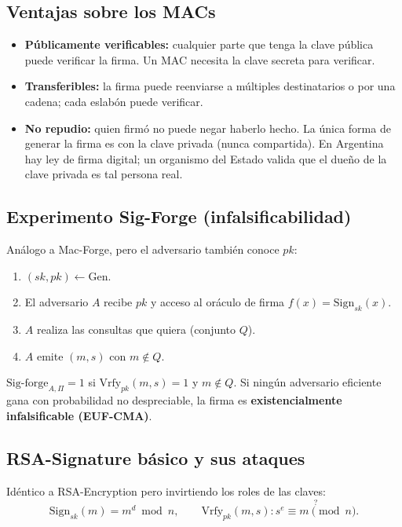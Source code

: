 \documentclass[11pt,a4paper]{article}
\begin{document}
\subsection{Ventajas sobre los MACs}

\begin{itemize}[leftmargin=1.4em,nosep]
  \item \textbf{Públicamente verificables:} cualquier parte que tenga la clave pública
  puede verificar la firma. Un MAC necesita la clave secreta para verificar.
  \item \textbf{Transferibles:} la firma puede reenviarse a múltiples destinatarios o
  por una cadena; cada eslabón puede verificar.
  \item \textbf{No repudio:} quien firmó no puede negar haberlo hecho. La única forma
  de generar la firma es con la clave privada (nunca compartida). En Argentina hay ley
  de firma digital; un organismo del Estado valida que el dueño de la clave privada es
  tal persona real.
\end{itemize}

\subsection{Experimento Sig-Forge (infalsificabilidad)}

Análogo a Mac-Forge, pero el adversario también conoce $pk$:

\begin{enumerate}[leftmargin=1.6em,nosep]
  \item $(sk, pk) \leftarrow \mathrm{Gen}$.
  \item El adversario $A$ recibe $pk$ y acceso al oráculo de firma $f(x) = \mathrm{Sign}_{sk}(x)$.
  \item $A$ realiza las consultas que quiera (conjunto $Q$).
  \item $A$ emite $(m, s)$ con $m \notin Q$.
\end{enumerate}

$\mathrm{Sig\text{-}forge}_{A,\Pi} = 1$ si $\mathrm{Vrfy}_{pk}(m, s) = 1$ y $m \notin Q$.
Si ningún adversario eficiente gana con probabilidad no despreciable, la firma es
\textbf{existencialmente infalsificable (EUF-CMA)}.

\subsection{RSA-Signature básico y sus ataques}

Idéntico a RSA-Encryption pero invirtiendo los roles de las claves:
\[
  \mathrm{Sign}_{sk}(m) = m^d \bmod n, \qquad
  \mathrm{Vrfy}_{pk}(m, s): \overset{?}{s^e \equiv m \pmod{n}}.
\]
\end{document}
